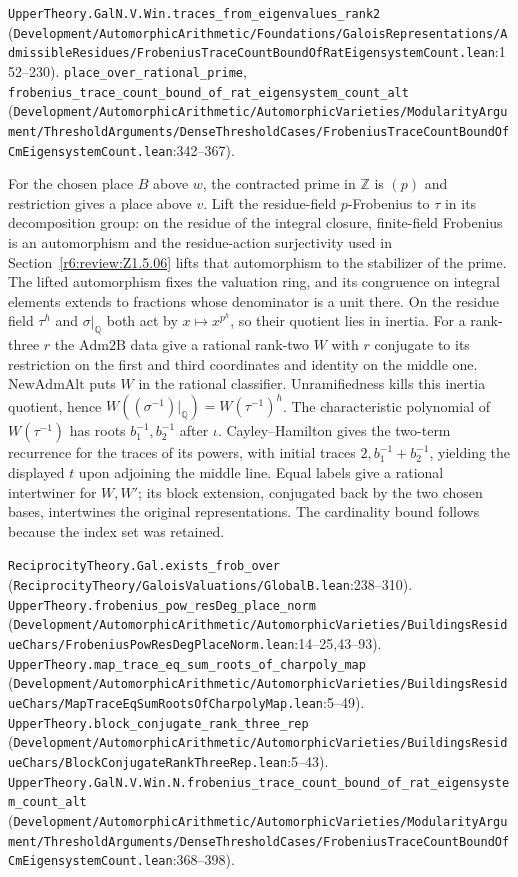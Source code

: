 {\footnotesize \nolinkurl{UpperTheory.GalN.V.Win.traces_from_eigenvalues_rank2} (\nolinkurl{Development/AutomorphicArithmetic/Foundations/GaloisRepresentations/AdmissibleResidues/FrobeniusTraceCountBoundOfRatEigensystemCount.lean}\allowbreak:152--230). \nolinkurl{place_over_rational_prime}, \nolinkurl{frobenius_trace_count_bound_of_rat_eigensystem_count_alt} (\nolinkurl{Development/AutomorphicArithmetic/AutomorphicVarieties/ModularityArgument/ThresholdArguments/DenseThresholdCases/FrobeniusTraceCountBoundOfCmEigensystemCount.lean}\allowbreak:342--367).}

For the chosen place $B$ above $w$, the contracted prime in $\mathbb Z$ is $(p)$ and restriction gives a place above $v$. Lift the residue-field $p$-Frobenius to $\tau$ in its decomposition group: on the residue of the integral closure, finite-field Frobenius is an automorphism and the residue-action surjectivity used in Section~\ref{r6:review:Z1.5.06} lifts that automorphism to the stabilizer of the prime. The lifted automorphism fixes the valuation ring, and its congruence on integral elements extends to fractions whose denominator is a unit there. On the residue field $\tau^h$ and $\sigma|_{\mathbb Q}$ both act by $x\mapsto x^{p^h}$, so their quotient lies in inertia. For a rank-three $r$ the $\mathrm{Adm2B}$ data give a rational rank-two $W$ with $r$ conjugate to its restriction on the first and third coordinates and identity on the middle one. $\mathrm{NewAdmAlt}$ puts $W$ in the rational classifier. Unramifiedness kills this inertia quotient, hence $W((\sigma^{-1})|_{\mathbb Q})=W(\tau^{-1})^h$. The characteristic polynomial of $W(\tau^{-1})$ has roots $b_1^{-1},b_2^{-1}$ after $\iota$. Cayley--Hamilton gives the two-term recurrence for the traces of its powers, with initial traces $2,b_1^{-1}+b_2^{-1}$, yielding the displayed $t$ upon adjoining the middle line. Equal labels give a rational intertwiner for $W,W'$; its block extension, conjugated back by the two chosen bases, intertwines the original representations. The cardinality bound follows because the index set was retained.

{\footnotesize \nolinkurl{ReciprocityTheory.Gal.exists_frob_over} (\nolinkurl{ReciprocityTheory/GaloisValuations/GlobalB.lean}\allowbreak:238--310). \nolinkurl{UpperTheory.frobenius_pow_resDeg_place_norm} (\nolinkurl{Development/AutomorphicArithmetic/AutomorphicVarieties/BuildingsResidueChars/FrobeniusPowResDegPlaceNorm.lean}\allowbreak:14--25,43--93). \nolinkurl{UpperTheory.map_trace_eq_sum_roots_of_charpoly_map} (\nolinkurl{Development/AutomorphicArithmetic/AutomorphicVarieties/BuildingsResidueChars/MapTraceEqSumRootsOfCharpolyMap.lean}\allowbreak:5--49). \nolinkurl{UpperTheory.block_conjugate_rank_three_rep} (\nolinkurl{Development/AutomorphicArithmetic/AutomorphicVarieties/BuildingsResidueChars/BlockConjugateRankThreeRep.lean}\allowbreak:5--43). \nolinkurl{UpperTheory.GalN.V.Win.N.frobenius_trace_count_bound_of_rat_eigensystem_count_alt} (\nolinkurl{Development/AutomorphicArithmetic/AutomorphicVarieties/ModularityArgument/ThresholdArguments/DenseThresholdCases/FrobeniusTraceCountBoundOfCmEigensystemCount.lean}\allowbreak:368--398).}

